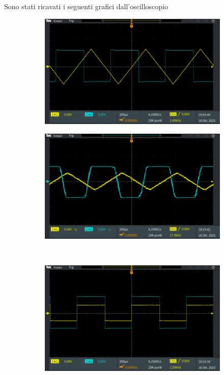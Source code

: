 \documentclass[a4paper,12pt]{article}
\begin{document}
Sono stati ricavati i seguenti grafici dall'oscilloscopio

\begin{figure}
    \centering
    \begin{subfigure}{0.49\linewidth}
        \includegraphics[width = \linewidth]{immagini/schmitt/schmitt_vin_vout.png}
        \caption{}
    \end{subfigure}
    \begin{subfigure}{0.49\linewidth}
        \includegraphics[width = \linewidth]{immagini/schmitt/schmitt_vin_vout_rumoroso.png}
        \caption{}
    \end{subfigure}
    \\[0.5cm]
    \begin{subfigure}{0.49\linewidth}
        \includegraphics[width = \linewidth]{immagini/schmitt/schmitt_v+_vout.png}

\end{subfigure}
\end{figure}
\end{document}
